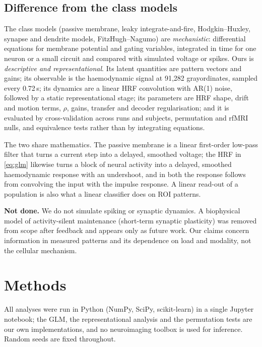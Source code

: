 \documentclass[conference]{IEEEtran}
\begin{document}
\subsection{Difference from the class models}
The class models (passive membrane, leaky integrate-and-fire, Hodgkin--Huxley, synapse and dendrite models, FitzHugh--Nagumo) are \emph{mechanistic}: differential equations for membrane potential and gating variables, integrated in time for one neuron or a small circuit and compared with simulated voltage or spikes. Ours is \emph{descriptive and representational}. Its latent quantities are pattern vectors and gains; its observable is the haemodynamic signal at 91{,}282 grayordinates, sampled every 0.72\,s; its dynamics are a linear HRF convolution with AR(1) noise, followed by a static representational stage; its parameters are HRF shape, drift and motion terms, $\rho$, gains, transfer and decoder regularisation; and it is evaluated by cross-validation across runs and subjects, permutation and rfMRI nulls, and equivalence tests rather than by integrating equations.

The two share mathematics. The passive membrane is a linear first-order low-pass filter that turns a current step into a delayed, smoothed voltage; the HRF in \eqref{eq:glm} likewise turns a block of neural activity into a delayed, smoothed haemodynamic response with an undershoot, and in both the response follows from convolving the input with the impulse response. A linear read-out of a population is also what a linear classifier does on ROI patterns.

\textbf{Not done.} We do not simulate spiking or synaptic dynamics. A biophysical model of activity-silent maintenance (short-term synaptic plasticity) was removed from scope after feedback and appears only as future work. Our claims concern information in measured patterns and its dependence on load and modality, not the cellular mechanism.

\section{Methods}
\label{sec:methods}

All analyses were run in Python (NumPy, SciPy, scikit-learn) in a single Jupyter notebook; the GLM, the representational analysis and the permutation tests are our own implementations, and no neuroimaging toolbox is used for inference. Random seeds are fixed throughout.
\end{document}
